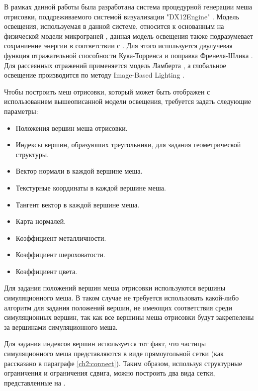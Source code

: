 	В рамках данной работы была разработана система процедурной генерации меша отрисовки, поддреживаемого системой визуализации "DX12Engine" \cite{me_bachelor}. Модель освещения, используемая в данной системе, относится к основанным на физической модели микрограней \cite{walter2007microfacet}, данная модель освещения также подразумевает сохраниение энергии в соответствии с  \cite{kajiya1986rendering}. Для этого используется двулучевая функция отражательной способности Кука-Торренса \cite{cook1982reflectance} и поправка Френеля-Шлика \cite{schlick1994inexpensive}. Для рассеянных отражений применяется модель Ламберта \cite{ikeuchi2014lambertian}, а глобальное освещение производится по методу Image-Based Lighting \cite{debevec1998rendering}.
	
	Чтобы построить меш отрисовки, который может быть отображен с использованием вышеописанной модели освещения, требуется задать следующие параметры:
	\begin{itemize}
		\item Положения вершин меша отрисовки.
		\item Индексы вершин, образуюших треугольники, для задания геометрической структуры.
		\item Вектор нормали в каждой вершине меша.
		\item Текстурные координаты в каждой вершине меша.
		\item Тангент вектор в каждой вершине меша.
		\item Карта нормалей.
		\item Коэффициент металличности.
		\item Коэффициент шероховатости.
		\item Коэффициент цвета.
	\end{itemize}
	
	Для задания положений вершин меша отрисовки используются вершины симуляционного меша. В таком случае не требуется использовать какой-либо алгоритм для задания положений вершин, не имеющих соответствия среди симуляционных вершин, так как все вершины меша отрисовки будут закрепелены за вершинами симуляционного меша.
	
	Для задания индексов вершин используется тот факт, что частицы симуляционного меша представляются в виде прямоугольной сетки (как рассказано в параграфе \ref{ch2:connect}). Таким образом, используя структурные ограничения и ограничения сдвига, можно построить два вида сетки, представленные на .
	
